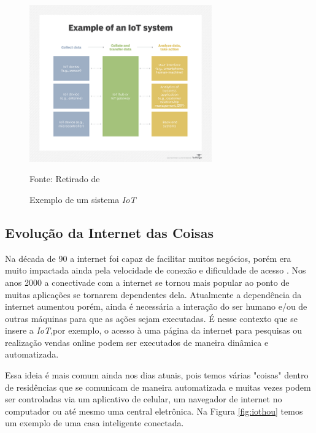 \documentclass[../../layout.tex]{subfiles}
\begin{document}
\begin{figure}[H]
\centering
\caption{Exemplo de um sistema \emph{IoT}}
\includegraphics[width=0.7\textwidth]{assets/static/img/iot_system.jpg}
\label{fig:iotsystem}

\begin{minipage}{0.5\textwidth}
\raggedright \footnotesize Fonte: Retirado de \cite{iot_system} 
\end{minipage}
\end{figure}

\subsection{Evolução da Internet das Coisas}

\hspace*{3em}Na década de 90 a internet foi capaz de facilitar muitos negócios, porém era muito impactada ainda pela velocidade de conexão e dificuldade de acesso \cite{iothouse}. Nos anos 2000 a conectivade com a internet se tornou mais popular ao ponto de muitas aplicações se tornarem dependentes dela. Atualmente a dependência da internet aumentou porém, ainda é necessária a interação do ser humano e/ou de outras máquinas para que as ações sejam executadas. É nesse contexto que se insere a \emph{IoT},por exemplo, o acesso à uma página da internet para pesquisas ou realização vendas online podem ser executados de maneira dinâmica e automatizada. \par
Essa ideia é mais comum ainda nos dias atuais, pois temos várias "coisas" dentro de residências que se comunicam de maneira automatizada e muitas vezes podem  ser controladas via um aplicativo de celular, um navegador de internet no computador ou até mesmo uma central eletrônica. Na Figura \ref{fig:iothou} temos um exemplo de uma casa inteligente conectada.
\end{document}
